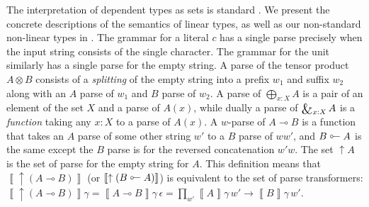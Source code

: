 \documentclass[acmsmall,nonacm]{acmart}
\newcommand{\sem}[1]{\left\llbracket{#1}\right\rrbracket}
\newcommand{\lto}{\multimap}
\newcommand{\tol}{\mathrel{\rotatebox[origin=c]{180}{$\lto$}}}
\DeclareMathOperator*{\bigwith}{\scalerel*{\&}{\bigoplus}}
\begin{document}
The interpretation of dependent types as sets is standard
\cite{Hofmann_1997}. We present the concrete descriptions of the
semantics of linear types, as well as our non-standard non-linear
types in . The grammar for a literal $c$ has a
single parse precisely when the input string consists of the single
character. The grammar for the unit similarly has a single parse for
the empty string.  A parse of the tensor product $A \otimes B$
consists of a \emph{splitting} of the empty string into a prefix $w_1$
and suffix $w_2$ along with an $A$ parse of $w_1$ and $B$ parse of
$w_2$. A parse of $\bigoplus_{x:X} A$ is a pair of an element of the
set $X$ and a parse of $A(x)$, while dually a parse of $\bigwith_{x:X}
A$ is a \emph{function} taking any $x:X$ to a parse of $A(x)$. A
$w$-parse of $A \lto B$ is a function that takes an $A$ parse of some
other string $w'$ to a $B$ parse of $ww'$, and $B \tol A$ is the same
except the $B$ parse is for the reversed concatenation $w'w$.
%
The set $\uparrow A$ is the set of parse for the empty string for
$A$. This definition means that $\sem{\uparrow (A \lto B)}$ (or $\sem{\uparrow (B \tol A)}$) is
equivalent to the set of parse transformers:
\( \sem{\uparrow (A \lto B)}\gamma = \sem{A \lto B}\gamma\,\epsilon = \prod_{w'} \sem{A}\gamma\,w' \to \sem{B}\gamma\,w'\).
\end{document}
